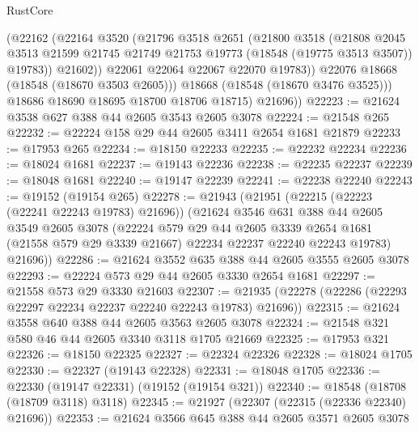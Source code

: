 \begin{lexlean}{RustCore}
\begin{coremodule}
                (@22162
                  (@22164
                    @3520
                    (@21796
                      @3518
                      @2651
                      (@21800
                        @3518
                        (@21808
                          @2045
                          @3513
                          @21599
                          @21745
                          @21749
                          @21753
                          @19773
                          (@18548 (@19775 @3513 @3507))
                          @19783))
                      @21602))
                  @22061
                  @22064
                  @22067
                  @22070
                  @19783))
              @22076
              @18668
              (@18548 (@18670 @3503 @2605)))
            @18668
            (@18548 (@18670 @3476 @3525)))
          @18686
          @18690
          @18695
          @18700
          @18706
          @18715)
        @21696))
@22223 := @21624 @3538 @627 @388 @44 @2605 @3543 @2605 @3078
@22224 := @21548 @265
@22232 := @22224 @158 @29 @44 @2605 @3411 @2654 @1681 @21879
@22233 := @17953 @265
@22234 := @18150 @22233
@22235 := @22232 @22234
@22236 := @18024 @1681
@22237 := @19143 @22236
@22238 := @22235 @22237
@22239 := @18048 @1681
@22240 := @19147 @22239
@22241 := @22238 @22240
@22243 := @19152 (@19154 @265)
@22278 := @21943
    (@21951
      (@22215 (@22223 (@22241 @22243 @19783) @21696))
      (@21624
        @3546
        @631
        @388
        @44
        @2605
        @3549
        @2605
        @3078
        (@22224
          @579
          @29
          @44
          @2605
          @3339
          @2654
          @1681
          (@21558 @579 @29 @3339 @21667)
          @22234
          @22237
          @22240
          @22243
          @19783)
        @21696))
@22286 := @21624 @3552 @635 @388 @44 @2605 @3555 @2605 @3078
@22293 := @22224 @573 @29 @44 @2605 @3330 @2654 @1681
@22297 := @21558 @573 @29 @3330 @21603
@22307 := @21935 (@22278 (@22286 (@22293 @22297 @22234 @22237 @22240 @22243 @19783) @21696))
@22315 := @21624 @3558 @640 @388 @44 @2605 @3563 @2605 @3078
@22324 := @21548 @321 @580 @46 @44 @2605 @3340 @3118 @1705 @21669
@22325 := @17953 @321
@22326 := @18150 @22325
@22327 := @22324 @22326
@22328 := @18024 @1705
@22330 := @22327 (@19143 @22328)
@22331 := @18048 @1705
@22336 := @22330 (@19147 @22331) (@19152 (@19154 @321))
@22340 := @18548 (@18708 (@18709 @3118) @3118)
@22345 := @21927 (@22307 (@22315 (@22336 @22340) @21696))
@22353 := @21624 @3566 @645 @388 @44 @2605 @3571 @2605 @3078

\end{coremodule}
\end{lexlean}
